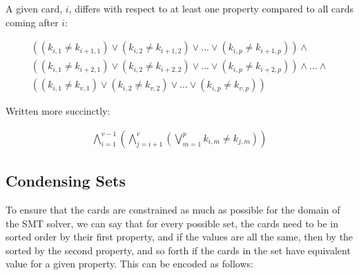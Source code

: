 \documentclass[pageno]{jpaper}
\begin{document}

A given card, $i$, differs with respect to at least one property compared to all cards coming after $i:$

\begin{multline}
	((k_{i,1} \neq k_{i+1,1}) \vee (k_{i,2} \neq k_{i+1,2}) \vee ... \vee (k_{i,p} \neq k_{i+1,p}))  \wedge \\
	((k_{i,1} \neq k_{i+2,1}) \vee (k_{i,2} \neq k_{i+2,2}) \vee ... \vee (k_{i,p} \neq k_{i+2,p}))  \wedge ... \wedge \\ 
	((k_{i,1} \neq k_{v,1}) \vee (k_{i,2} \neq k_{v,2}) \vee ... \vee (k_{i,p} \neq k_{v,p})) 
\end{multline}

Written more succinctly:





\begin{align}
	\bigwedge \limits_{i=1}^{v-1}   \left( \bigwedge \limits_{j=i+1}^{v}   \left( \bigvee \limits_{m = 1}^{p} k_{i,m} \neq k_{j,m} \right)  \right)
\end{align}

\subsection {Condensing Sets}

To ensure that the cards are constrained as much as possible for the domain of the SMT solver, we can say that for every possible set, the cards need to be in sorted order by their first property, and if the values are all the same, then by the sorted by the second property, and so forth if the cards in the set have equivalent value for a given property. This can be encoded as follows: 
\end{document}
